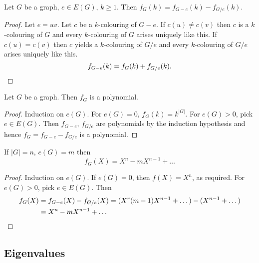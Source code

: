 \documentclass{article}
\begin{document}
\begin{nthm}\label{thm:43}
    Let $G$ be a graph, $e \in E(G)$, $k \geq 1$. Then $f_G(k) = f_{G-e}(k) - f_{G/e} (k)$.
\end{nthm}
\begin{proof}
    Let $e = uv$. Let $c$ be a $k$-colouring of $G-e$.
    If $c(u) \neq c(v)$ then $c$ is a $k$-colouring of $G$ and every $k$-colouring of $G$ arises uniquely like this.
    If $c(u) = c(v)$ then $c$ yields a $k$-colouring of $G/e$ and every $k$-colouring of $G/e$ arises uniquely like this.
    \begin{equation*}
        f_{G-e}(k) = f_G(k) + f_{G/e} (k). \qedhere
    \end{equation*}
\end{proof}
\begin{ncor}\label{cor:44}
    Let $G$ be a graph. Then $f_G$ is a polynomial.
\end{ncor}
\begin{proof}
    Induction on $e(G)$. For $e(G) = 0$, $f_G(k) = k^{|G|}$.
    For $e(G) > 0$, pick $e \in E(G)$. Then $f_{G-e}$, $f_{G/e}$ are polynomials by the induction hypothesis and hence $f_G = f_{G-e} - f_{G/e}$ is a polynomial.
\end{proof}













\begin{ncor}\label{cor:45}
    If $|G| = n$, $e(G) = m$ then
    \begin{equation*}
        f_G(X) = X^n - m X^{n-1} + \dotsc
    \end{equation*}
\end{ncor}
\begin{proof}
    Induction on $e(G)$. If $e(G)=0$, then $f(X) = X^n$, as required.
    For $e(G) > 0$, pick $e \in E(G)$.
    Then
    \begin{align*}
        f_G(X) &= f_{G-e}(X) - f_{G/e}(X) = (X^r (m-1) X^{n-1} + \dotsc) - (X^{n-1} + \dotsc) \\
               &= X^n - m X^{n-1} + \dotsc \qedhere
    \end{align*}
\end{proof}
\subsection{Eigenvalues}
\end{document}
